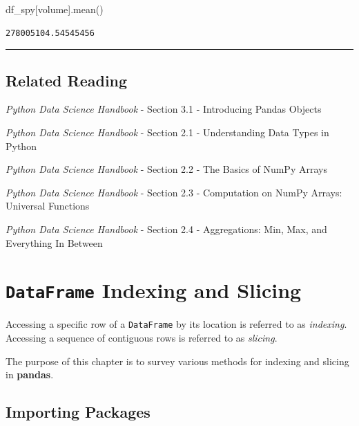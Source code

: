 \documentclass[
  letterpaper,
  DIV=11,
  numbers=noendperiod]{scrreprt}
\newenvironment{Shaded}{\begin{snugshade}}{\end{snugshade}}
\newcommand{\NormalTok}[1]{\textcolor[rgb]{0.00,0.23,0.31}{#1}}
\newcommand{\StringTok}[1]{\textcolor[rgb]{0.13,0.47,0.30}{#1}}
\begin{document}
\begin{Shaded}
\begin{Highlighting}[]
\NormalTok{df\_spy[}\StringTok{\textquotesingle{}volume\textquotesingle{}}\NormalTok{].mean()}
\end{Highlighting}
\end{Shaded}

\begin{verbatim}
278005104.54545456
\end{verbatim}

\begin{center}\rule{0.5\linewidth}{0.5pt}\end{center}

\hypertarget{related-reading}{%
\section{Related Reading}\label{related-reading}}

\emph{Python Data Science Handbook} - Section 3.1 - Introducing Pandas
Objects

\emph{Python Data Science Handbook} - Section 2.1 - Understanding Data
Types in Python

\emph{Python Data Science Handbook} - Section 2.2 - The Basics of NumPy
Arrays

\emph{Python Data Science Handbook} - Section 2.3 - Computation on NumPy
Arrays: Universal Functions

\emph{Python Data Science Handbook} - Section 2.4 - Aggregations: Min,
Max, and Everything In Between

\hypertarget{dataframe-indexing-and-slicing}{%
\chapter{\texorpdfstring{\texttt{DataFrame} Indexing and
Slicing}{DataFrame Indexing and Slicing}}\label{dataframe-indexing-and-slicing}}

Accessing a specific row of a \texttt{DataFrame} by its location is
referred to as \emph{indexing}. Accessing a sequence of contiguous rows
is referred to as \emph{slicing}.

The purpose of this chapter is to survey various methods for indexing
and slicing in \textbf{pandas}.

\hypertarget{importing-packages-2}{%
\section{Importing Packages}\label{importing-packages-2}}
\end{document}
